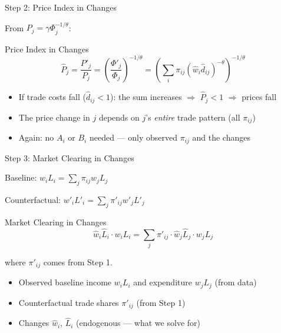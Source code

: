 \documentclass{beamer}
\begin{document}
\begin{frame}{Step 2: Price Index in Changes}

    From $P_j = \gamma \Phi_j^{-1/\theta}$:

    \vspace{0.3em}
    \begin{block}{Price Index in Changes}
        \vspace{-0.5em}
        \[ \hat{P}_j = \frac{P'_j}{P_j} = \left(\frac{\Phi'_j}{\Phi_j}\right)^{-1/\theta} = \left(\sum_{i} \pi_{ij} (\hat{w}_i \hat{d}_{ij})^{-\theta}\right)^{-1/\theta} \]
    \end{block}

    \vspace{0.3em}
    \begin{itemize}
        \item If trade costs fall ($\hat{d}_{ij} < 1$): the sum increases $\Rightarrow$ $\hat{P}_j < 1$ $\Rightarrow$ prices fall
        \item The price change in $j$ depends on $j$'s \emph{entire} trade pattern (all $\pi_{ij}$)
        \item Again: no $A_i$ or $B_i$ needed --- only observed $\pi_{ij}$ and the changes
    \end{itemize}

\end{frame}

\begin{frame}{Step 3: Market Clearing in Changes}

    Baseline: $w_i L_i = \sum_j \pi_{ij} w_j L_j$

    \vspace{0.3em}
    Counterfactual: $w'_i L'_i = \sum_j \pi'_{ij} w'_j L'_j$

    \vspace{0.5em}
    \begin{block}{Market Clearing in Changes}
        \vspace{-0.5em}
        \[ \hat{w}_i \hat{L}_i \cdot w_i L_i = \sum_j \pi'_{ij} \cdot \hat{w}_j \hat{L}_j \cdot w_j L_j \]
    \end{block}

    \vspace{0.3em}
    where $\pi'_{ij}$ comes from Step 1.

    \vspace{0.5em}
    \begin{itemize}
        \item Observed baseline income $w_i L_i$ and expenditure $w_j L_j$ (from data)
        \item Counterfactual trade shares $\pi'_{ij}$ (from Step 1)
        \item Changes $\hat{w}_i$, $\hat{L}_i$ (endogenous --- what we solve for)
    \end{itemize}

\end{frame}
\end{document}
